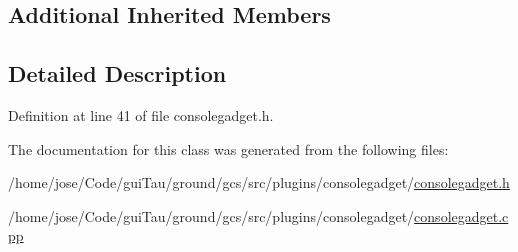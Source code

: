 \subsection*{Additional Inherited Members}


\subsection{Detailed Description}


Definition at line 41 of file consolegadget.\-h.



The documentation for this class was generated from the following files\-:\begin{DoxyCompactItemize}
\item 
/home/jose/\-Code/gui\-Tau/ground/gcs/src/plugins/consolegadget/\hyperlink{consolegadget_8h}{consolegadget.\-h}\item 
/home/jose/\-Code/gui\-Tau/ground/gcs/src/plugins/consolegadget/\hyperlink{consolegadget_8cpp}{consolegadget.\-cpp}\end{DoxyCompactItemize}
